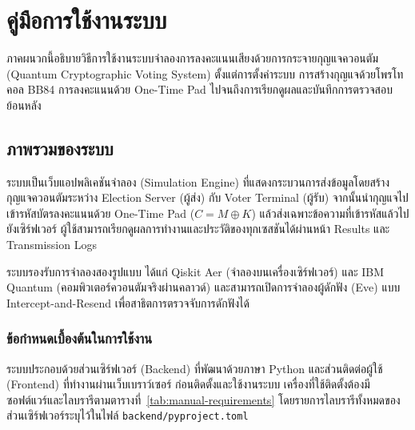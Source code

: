 \providecommand{\tbd}[1]{\textbf{[รอระบุ: #1]}}

\chapter{คู่มือการใช้งานระบบ}
\label{app:manual}

ภาคผนวกนี้อธิบายวิธีการใช้งานระบบจำลองการลงคะแนนเสียงด้วยการกระจายกุญแจควอนตัม
(Quantum Cryptographic Voting System) ตั้งแต่การตั้งค่าระบบ การสร้างกุญแจด้วยโพรโทคอล BB84
การลงคะแนนด้วย One-Time Pad ไปจนถึงการเรียกดูผลและบันทึกการตรวจสอบย้อนหลัง

\section{ภาพรวมของระบบ}

ระบบเป็นเว็บแอปพลิเคชันจำลอง (Simulation Engine) ที่แสดงกระบวนการส่งข้อมูลโดยสร้างกุญแจควอนตัมระหว่าง
Election Server (ผู้ส่ง) กับ Voter Terminal (ผู้รับ) จากนั้นนำกุญแจไปเข้ารหัสบัตรลงคะแนนด้วย
One-Time Pad ($C = M \oplus K$) แล้วส่งเฉพาะข้อความที่เข้ารหัสแล้วไปยังเซิร์ฟเวอร์
ผู้ใช้สามารถเรียกดูผลการทำงานและประวัติของทุกเซสชันได้ผ่านหน้า Results และ Transmission Logs

ระบบรองรับการจำลองสองรูปแบบ ได้แก่ Qiskit Aer (จำลองบนเครื่องเซิร์ฟเวอร์) และ IBM Quantum
(คอมพิวเตอร์ควอนตัมจริงผ่านคลาวด์) และสามารถเปิดการจำลองผู้ดักฟัง (Eve)
แบบ Intercept-and-Resend เพื่อสาธิตการตรวจจับการดักฟังได้

\subsection{ข้อกำหนดเบื้องต้นในการใช้งาน}
ระบบประกอบด้วยส่วนเซิร์ฟเวอร์ (Backend) ที่พัฒนาด้วยภาษา Python
และส่วนติดต่อผู้ใช้ (Frontend) ที่ทำงานผ่านเว็บเบราว์เซอร์
ก่อนติดตั้งและใช้งานระบบ เครื่องที่ใช้ติดตั้งต้องมีซอฟต์แวร์และไลบรารีตามตารางที่~\ref{tab:manual-requirements}
โดยรายการไลบรารีทั้งหมดของส่วนเซิร์ฟเวอร์ระบุไว้ในไฟล์ \texttt{backend/pyproject.toml}

